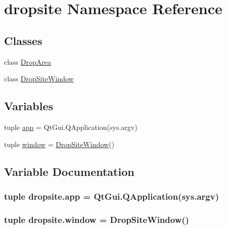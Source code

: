 \hypertarget{namespacedropsite}{}\section{dropsite Namespace Reference}
\label{namespacedropsite}
\subsection*{Classes}
\begin{DoxyCompactItemize}
\item 
class \hyperlink{classdropsite_1_1DropArea}{Drop\+Area}
\item 
class \hyperlink{classdropsite_1_1DropSiteWindow}{Drop\+Site\+Window}
\end{DoxyCompactItemize}
\subsection*{Variables}
\begin{DoxyCompactItemize}
\item 
tuple \hyperlink{namespacedropsite_a4a9db7e29e968d8e6190455f15859a51}{app} = Qt\+Gui.\+Q\+Application(sys.\+argv)
\item 
tuple \hyperlink{namespacedropsite_aec39185ee442e39a27619611256a497d}{window} = \hyperlink{classdropsite_1_1DropSiteWindow}{Drop\+Site\+Window}()
\end{DoxyCompactItemize}


\subsection{Variable Documentation}
\hypertarget{namespacedropsite_a4a9db7e29e968d8e6190455f15859a51}{}
\subsubsection[{app}]{\setlength{\rightskip}{0pt plus 5cm}tuple dropsite.\+app = Qt\+Gui.\+Q\+Application(sys.\+argv)}\label{namespacedropsite_a4a9db7e29e968d8e6190455f15859a51}
\hypertarget{namespacedropsite_aec39185ee442e39a27619611256a497d}{}
\subsubsection[{window}]{\setlength{\rightskip}{0pt plus 5cm}tuple dropsite.\+window = {\bf Drop\+Site\+Window}()}\label{namespacedropsite_aec39185ee442e39a27619611256a497d}
